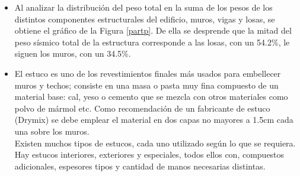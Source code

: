 \documentclass[letterpaper,11pt]{article} %
\begin{document}
\begin{itemize}
    
    
    \newpage
    \item Al analizar la distribución del peso total en la suma de los pesos de los distintos componentes estructurales del edificio, muros, vigas y losas, se obtiene el gráfico de la Figura \ref{partp}. De ella se desprende que la mitad del peso sísmico total de la estructura corresponde a las losas, con un 54.2\%, le siguen los muros, con un 34.5\%.
    
    
    \item El estuco es uno de los revestimientos finales más usados para embellecer muros y techos; consiste en una masa o pasta muy fina compuesto de un material base: cal, yeso o cemento que se mezcla con otros materiales como polvo de mármol etc. Como recomendación de un fabricante de estuco (Drymix) se debe emplear el material en dos capas no mayores a 1.5cm cada una sobre los muros.\\
    
    Existen muchos tipos de estucos, cada uno utilizado según lo que se requiera. Hay estucos interiores, exteriores y especiales, todos ellos con, compuestos adicionales, espesores tipos y cantidad de manos necesarias distintas.
\end{itemize}
    
\end{document}

